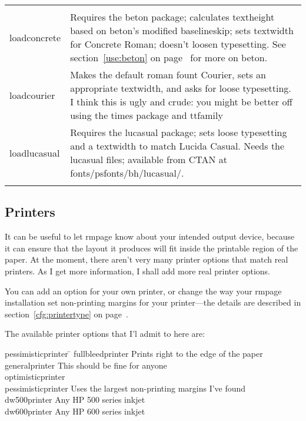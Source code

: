 \documentclass[11pt,loose,twoside,touchwider,longish,
                      noheaders,a4paper,notstdmargins]{report}
\newcommand*{\filename}[1]{{\ttfamily #1}}
\newcommand*{\packname}[1]{{\sffamily #1}}
\DeclareRobustCommand*{\comname}[1]{{\ttfamily\makeatletter\bs #1\makeatother}}
\newcommand*{\classname}[1]{{\ttfamily #1}}
\newcommand*{\optname}[1]{{\ttfamily #1}}
\newcommand*{\rmpage}{\classname{rmpage}\xspace}
\begin{document}
\noindent
\begin{tabularx}{\textwidth}{lX}
%
&\\
%
\optname{loadconcrete} & Requires the \packname{beton} package;
calculates \comname{textheight} based on \packname{beton}'s modified
\comname{baselineskip}; sets \comname{textwidth} for Concrete Roman;
doesn't loosen typesetting.  See section~\ref{use:beton} on
page~\pageref{use:beton} for more on \packname{beton}.\\
%
\optname{loadcourier} & Makes the default roman fount Courier, sets an
appropriate \comname{textwidth}, and asks for \optname{loose}
typesetting.  I think this is ugly and crude: you might be better off
using the \packname{times} package and \comname{ttfamily}\\
%
\optname{loadlucasual} &  Requires the \packname{lucasual} package;
sets loose typesetting and a \comname{textwidth} to match Lucida
Casual.  Needs the \packname{lucasual} files;
available from CTAN at \filename{fonts/psfonts/bh/lucasual/}. \\
%
&\\
\end{tabularx}


\subsection{Printers}
\label{use:printers}

It can be useful to let \rmpage know about your intended output
device, because it can ensure that the layout it produces will fit
inside the printable region of the paper.  At the moment, there
aren't very many printer options that match real printers.  As I get
more information, I shall add more real printer options.

You can add an option for your own printer, or change the way your
\rmpage installation set non-printing margins for your printer---the
details are described in section~\ref{cfg:printertype} on
page~\pageref{cfg:printertype}.

The available printer options that I'l admit to here are:
\begin{tabbing}
\optname{pessimisticprinter} \= \kill
\optname{fullbleedprinter} \> Prints right to the edge of the paper\\
\optname{generalprinter} \> This should be fine for anyone\\
\optname{optimisticprinter} \> \\
\optname{pessimisticprinter} \> Uses the largest non-printing margins
I've found\\
\optname{dw500printer} \> Any HP 500 series inkjet\\
\optname{dw600printer} \>  Any HP 600 series inkjet\\
\end{tabbing}
\end{document}
